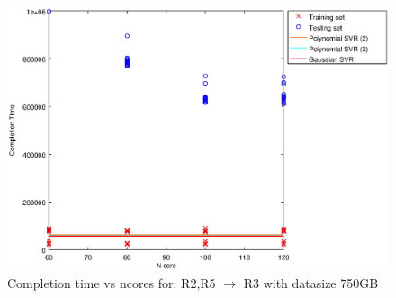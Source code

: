 
\begin {figure}[hbtp]
\centering
\includegraphics[width=\textwidth]{output/R2_R5_VS_R3_750_ALL_FEATURES/plot_R2_R5_VS_R3_750_bestmodels.eps}
\caption{Completion time vs ncores for: R2,R5 $\rightarrow$ R3 with datasize 750GB}
\label{fig:coreonly_linear_R2,R5_R3_750}
\end {figure}
